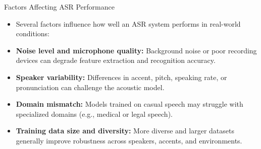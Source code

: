 \begin{frame}[allowframebreaks]{Factors Affecting ASR Performance}

\begin{itemize}
    \item Several factors influence how well an ASR system performs in real-world conditions:

    \item \textbf{Noise level and microphone quality:}  
    Background noise or poor recording devices can degrade feature extraction and recognition accuracy.

    \item \textbf{Speaker variability:}  
    Differences in accent, pitch, speaking rate, or pronunciation can challenge the acoustic model.

    \item \textbf{Domain mismatch:}  
    Models trained on casual speech may struggle with specialized domains (e.g., medical or legal speech).

    \item \textbf{Training data size and diversity:}  
    More diverse and larger datasets generally improve robustness across speakers, accents, and environments.
\end{itemize}

\end{frame}
